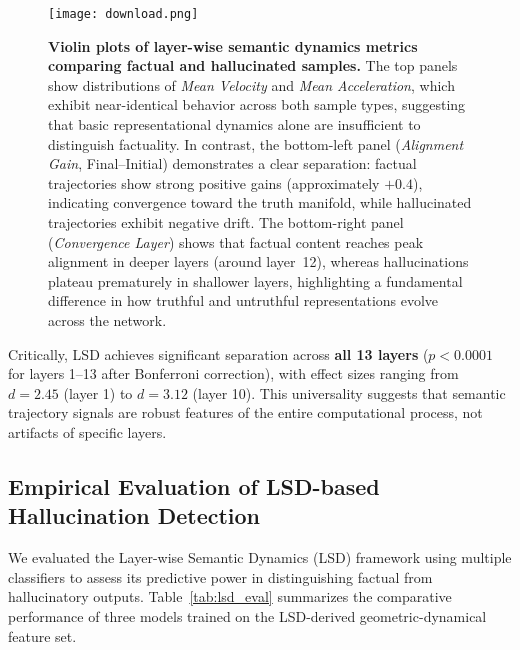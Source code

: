 \documentclass[11pt]{article}
\begin{document}
\begin{figure}[h]
\centering
\texttt{[image: download.png]}
\caption{\textbf{Violin plots of layer-wise semantic dynamics metrics comparing factual and hallucinated samples.}
The top panels show distributions of \textit{Mean Velocity} and \textit{Mean Acceleration}, which exhibit near-identical behavior across both sample types, suggesting that basic representational dynamics alone are insufficient to distinguish factuality. 
In contrast, the bottom-left panel (\textit{Alignment Gain}, Final–Initial) demonstrates a clear separation: factual trajectories show strong positive gains (approximately $+0.4$), indicating convergence toward the truth manifold, while hallucinated trajectories exhibit negative drift. 
The bottom-right panel (\textit{Convergence Layer}) shows that factual content reaches peak alignment in deeper layers (around layer~12), whereas hallucinations plateau prematurely in shallower layers, highlighting a fundamental difference in how truthful and untruthful representations evolve across the network.}

\label{fig:layer_separation}
\end{figure}

Critically, LSD achieves significant separation across \textbf{all 13 layers} ($p < 0.0001$ for layers 1--13 after Bonferroni correction), with effect sizes ranging from $d = 2.45$ (layer 1) to $d = 3.12$ (layer 10). This universality suggests that semantic trajectory signals are robust features of the entire computational process, not artifacts of specific layers.

\subsection{Empirical Evaluation of LSD-based Hallucination Detection}

We evaluated the Layer-wise Semantic Dynamics (LSD) framework using multiple classifiers to assess its predictive power in distinguishing factual from hallucinatory outputs. Table~\ref{tab:lsd_eval} summarizes the comparative performance of three models trained on the LSD-derived geometric-dynamical feature set.
\end{document}
